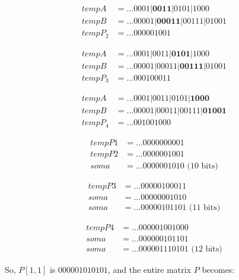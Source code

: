 \documentclass[12pt]{article}
\begin{document}
\begin{align*}
 tempA&= \ldots0001|\textbf{0011}|0101|1000\\
 tempB&= \ldots00001|\textbf{00011}|00111|01001\\
 tempP_2&= \ldots000001001
\end{align*}

\begin{align*}
 tempA&= \ldots0001|0011|\textbf{0101}|1000\\
 tempB&= \ldots00001|00011|\textbf{00111}|01001\\
 tempP_3&= \ldots000100011
\end{align*}

\begin{align*}
 tempA&= \ldots0001|0011|0101|\textbf{1000}\\
 tempB&= \ldots00001|00011|00111|\textbf{01001}\\
 tempP_4&= \ldots001001000
\end{align*}

\begin{align*}
 tempP1&= \ldots0000000001 \\
 tempP2&= \ldots0000001001 \\
   soma&= \ldots0000001010 \text{ (10 bits)}
\end{align*}

\begin{align*}
 tempP3&= \ldots00000100011 \\
   soma&= \ldots00000001010 \\
   soma&= \ldots00000101101 \text{ (11 bits)}
\end{align*}

\begin{align*}
 tempP4&= \ldots000001001000 \\
 soma&=   \ldots000000101101 \\
 soma&=   \ldots000001110101 \text{ (12 bits)}
\end{align*}

So, $P[1,1]$ is $000001010101$, and the entire matrix $P$ becomes:
\end{document}
